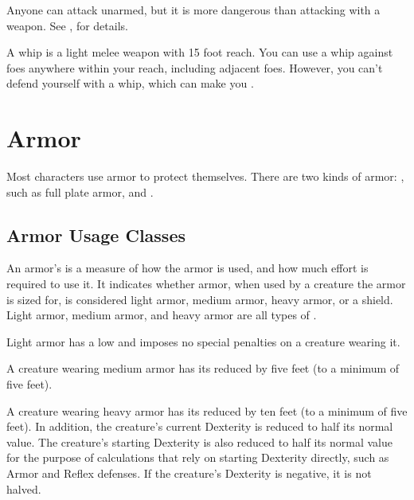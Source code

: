          Anyone can attack unarmed, but it is more dangerous than attacking with a weapon. See , for details.

         A whip is a light melee weapon with 15 foot reach.
        You can use a whip against foes anywhere within your reach, including adjacent foes.
        However, you can't defend yourself with a whip, which can make you .

\section{Armor}\label{Armor}

    Most characters use armor to protect themselves. There are two kinds of armor: , such as full plate armor, and .

    \subsection{Armor Usage Classes}\label{Armor Usage Classes}
        An armor's  is a measure of how the armor is used, and how much effort is required to use it.
        It indicates whether armor, when used by a creature the armor is sized for, is considered light armor, medium armor, heavy armor, or a shield.
        Light armor, medium armor, and heavy armor are all types of .

         Light armor has a low  and imposes no special penalties on a creature wearing it.

         A creature wearing medium armor has its  reduced by five feet (to a minimum of five feet).

         A creature wearing heavy armor has its  reduced by ten feet (to a minimum of five feet).
        In addition, the creature's current Dexterity is reduced to half its normal value.
        The creature's starting Dexterity is also reduced to half its normal value for the purpose of calculations that rely on starting Dexterity directly, such as Armor and Reflex defenses.
        If the creature's Dexterity is negative, it is not halved.

